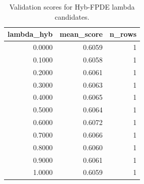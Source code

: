 \begin{table}[t]
\caption{Validation scores for Hyb-FPDE lambda candidates.}
\label{tab:lambda_distribution_computed}
\centering
\begin{tabular}{rrr}
\toprule
lambda\_hyb & mean\_score & n\_rows \\
\midrule
0.0000 & 0.6059 & 1 \\
0.1000 & 0.6058 & 1 \\
0.2000 & 0.6061 & 1 \\
0.3000 & 0.6063 & 1 \\
0.4000 & 0.6065 & 1 \\
0.5000 & 0.6064 & 1 \\
0.6000 & 0.6072 & 1 \\
0.7000 & 0.6066 & 1 \\
0.8000 & 0.6060 & 1 \\
0.9000 & 0.6061 & 1 \\
1.0000 & 0.6059 & 1 \\
\bottomrule
\end{tabular}

\end{table}
